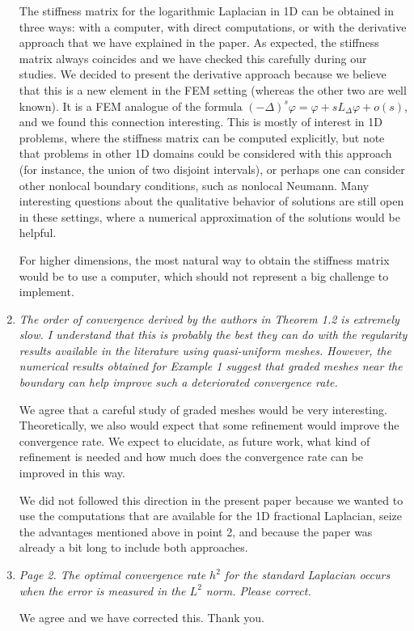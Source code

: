 \documentclass[11 pt]{article}
\numberwithin{equation}{section}
\begin{document}
\begin{enumerate}
The stiffness matrix for the logarithmic Laplacian in 1D can be obtained in three ways: with a computer, with direct computations, or with the derivative approach that we have explained in the paper. As expected, the stiffness matrix always coincides and we have checked this carefully during our studies. We decided to present the derivative approach because we believe that this is a new element in the FEM setting (whereas the other two are well known). It is a FEM analogue of the formula
$(-\Delta)^s\varphi = \varphi + sL_\Delta \varphi + o(s)$, and we found this connection interesting.  This is mostly of interest in 1D problems, where the stiffness matrix can be computed explicitly, but note that problems in other 1D domains could be considered with this approach (for instance, the union of two disjoint intervals), or perhaps one can consider other nonlocal boundary conditions, such as nonlocal Neumann.  Many interesting questions about the qualitative behavior of solutions are still open in these settings, where a numerical approximation of the solutions would be helpful.

For higher dimensions, the most natural way to obtain the stiffness matrix would be to use a computer, which should not represent a big challenge to implement.

\item \emph{
 The order of convergence derived by the authors in Theorem 1.2 is extremely slow. I understand that this is probably the best they can do with the regularity results available in the literature using quasi-uniform meshes. However, the numerical results obtained for Example 1 suggest that graded meshes near the boundary can help improve such a deteriorated convergence rate.
}

We agree that a careful study of graded meshes would be very interesting. Theoretically, we also would expect that some refinement would improve the convergence rate.  We expect to elucidate, as future work, what kind of refinement is needed and how much does the convergence rate can be improved in this way.

We did not followed this direction in the present paper because we wanted to use the computations that are available for the 1D fractional Laplacian, seize the advantages mentioned above in point 2, and because the paper was already a bit long to include both approaches.

\item
\emph{Page 2. The optimal convergence rate $h^2$ for the standard Laplacian occurs when the error is measured in the $L^2$ norm. Please correct.
}

We agree and we have corrected this. Thank you.
\end{enumerate}
\end{document}
